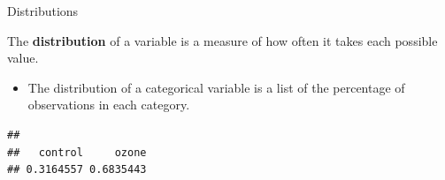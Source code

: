 \documentclass[
  ignorenonframetext,
]{beamer}
\newenvironment{Shaded}{\begin{snugshade}}{\end{snugshade}}
\newcommand{\KeywordTok}[1]{\textcolor[rgb]{0.13,0.29,0.53}{\textbf{#1}}}
\newcommand{\NormalTok}[1]{#1}
\newcommand{\OperatorTok}[1]{\textcolor[rgb]{0.81,0.36,0.00}{\textbf{#1}}}
\providecommand{\tightlist}{%
  \setlength{\itemsep}{0pt}\setlength{\parskip}{0pt}}
\begin{document}
\begin{frame}[fragile]{Distributions}
\protect\hypertarget{distributions}{}

The \textbf{distribution} of a variable is a measure of how often it
takes each possible value.

\begin{itemize}
\tightlist
\item
  The distribution of a categorical variable is a list of the percentage
  of observations in each category.
\end{itemize}

\begin{Shaded}
\end{Shaded}

\begin{verbatim}
## 
##   control     ozone 
## 0.3164557 0.6835443
\end{verbatim}

\end{frame}
\end{document}
